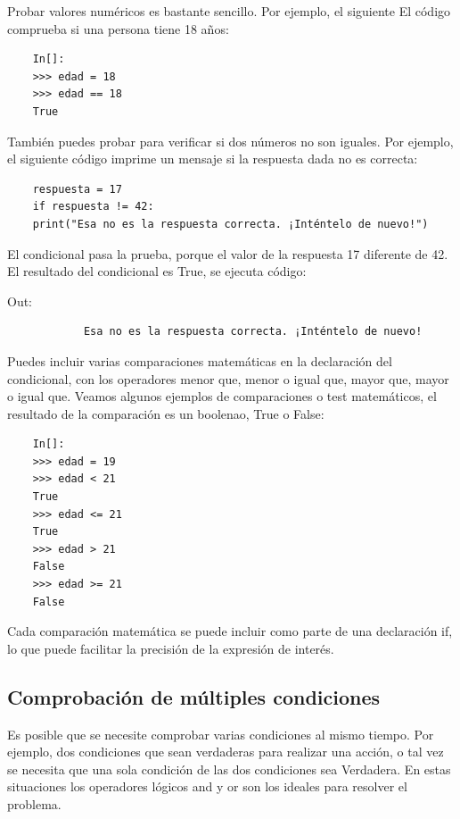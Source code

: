 Probar valores numéricos es bastante sencillo. Por ejemplo, el siguiente
El código comprueba si una persona tiene 18 años:

\begin{lstlisting}
	In[]:
	>>> edad = 18
	>>> edad == 18
	True
\end{lstlisting}

También puedes probar para verificar si dos números no son iguales. Por ejemplo, el
siguiente código imprime un mensaje si la respuesta dada no es correcta:

\hspace{-2.5cm}{\ttfamily \scriptsize concurso.py}  \vspace{-0.62cm}
\begin{lstlisting}		
	respuesta = 17
	if respuesta != 42:
	print("Esa no es la respuesta correcta. ¡Inténtelo de nuevo!")	
\end{lstlisting}	


El condicional pasa la prueba, porque el valor de la respuesta 17 diferente de 42. El resultado del condicional es  {\ttfamily True}, se ejecuta código: 

{\ttfamily\scriptsize\scriptsize \noindent Out:\vspace{-0.3cm}	
	{\color{blue} 	
		\begin{verbatim}
			Esa no es la respuesta correcta. ¡Inténtelo de nuevo!		
		\end{verbatim}
}}

Puedes incluir varias comparaciones matemáticas en la declaración del condicional, 
con los operadores  menor que, menor  o igual que, mayor que, mayor o igual que.
Veamos algunos ejemplos de comparaciones o test matemáticos, el resultado de la comparación es un boolenao, True o False:

\begin{lstlisting}
	In[]:	
	>>> edad = 19
	>>> edad < 21
	True
	>>> edad <= 21
	True
	>>> edad > 21
	False
	>>> edad >= 21
	False
\end{lstlisting}

Cada comparación matemática se puede incluir como parte de una declaración {\ttfamily if}, lo
que puede facilitar la precisión de la expresión de interés.

\subsection{Comprobación de múltiples condiciones}

Es posible que se necesite comprobar varias condiciones al mismo tiempo. Por ejemplo,
dos condiciones que sean verdaderas para realizar una acción, o tal vez se necesita que una sola condición de las dos condiciones sea Verdadera. En estas situaciones los operadores lógicos  {\ttfamily and} y {\ttfamily or}  son los ideales para resolver el problema.

